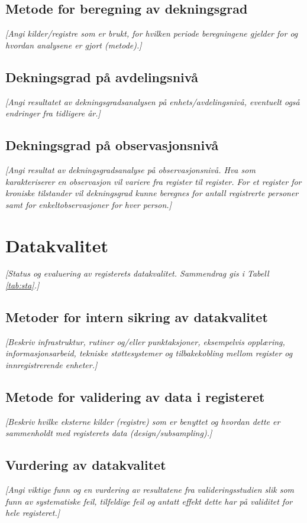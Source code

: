 \documentclass[norsk, a4paper, twocolumn]{report}
\newcommand{\guide}[1] {
	\textit{[\textcolor{guidegray}{#1}]}
	}
\begin{document}
\section{Metode for beregning av dekningsgrad}\label{sec:met}
\guide{Angi kilder/registre som er brukt, for hvilken periode beregningene
gjelder for og hvordan analysene er gjort (metode).}

\section{Dekningsgrad på avdelingsnivå}\label{sec:endek}
\guide{Angi resultatet av dekningsgradsanalysen på enhets/avdelingsnivå,
eventuelt også endringer fra tidligere år.}


\section{Dekningsgrad på observasjonsnivå}\label{sec:obs}
\guide{Angi resultat av dekningsgradsanalyse på observasjonsnivå. Hva som
karakteriserer en observasjon vil variere fra register til register. For et
register for kroniske tilstander vil dekningsgrad kunne beregnes for
antall registrerte personer samt for enkeltobservasjoner for hver person.}

\chapter{Datakvalitet}\label{cha:kva}
\guide{Status og evaluering av registerets  datakvalitet. Sammendrag
gis i Tabell \ref{tab:sta}.}

\section{Metoder for intern sikring av datakvalitet}\label{sec:sik}
\guide{Beskriv infrastruktur, rutiner og/eller punktaksjoner, eksempelvis
opplæring, informasjonsarbeid, tekniske støttesystemer og tilbakekobling mellom
register og innregistrerende enheter.}

\section{Metode for validering av data i registeret}\label{sec:metval}
\guide{Beskriv hvilke eksterne kilder (registre) som er benyttet og hvordan
dette er sammenholdt med registerets data (design/subsampling).} 

\section{Vurdering av datakvalitet}\label{sec:valdat}
\guide{Angi viktige funn og en vurdering av resultatene fra
valideringsstudien slik som funn av systematiske feil, tilfeldige feil og
antatt effekt dette har på validitet for hele registeret.}
\end{document}
